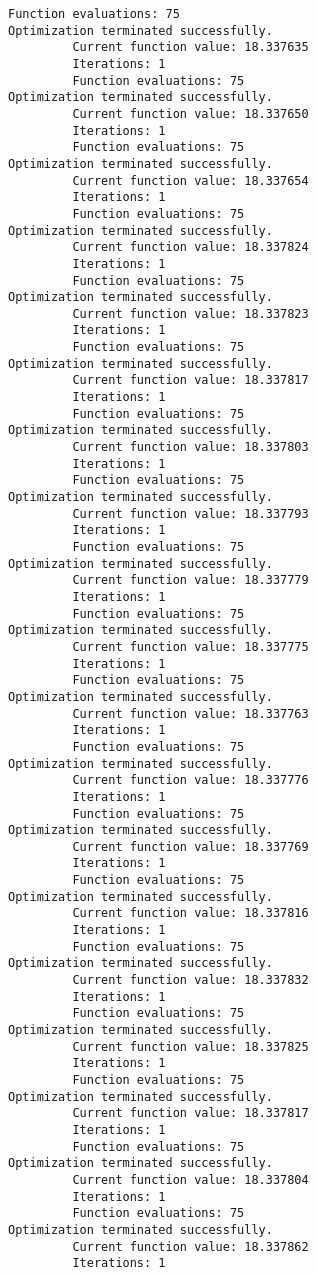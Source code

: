 \documentclass[11pt]{article}
\begin{document}
\begin{Verbatim}[commandchars=\\\{\}]
         Function evaluations: 75
Optimization terminated successfully.
         Current function value: 18.337635
         Iterations: 1
         Function evaluations: 75
Optimization terminated successfully.
         Current function value: 18.337650
         Iterations: 1
         Function evaluations: 75
Optimization terminated successfully.
         Current function value: 18.337654
         Iterations: 1
         Function evaluations: 75
Optimization terminated successfully.
         Current function value: 18.337824
         Iterations: 1
         Function evaluations: 75
Optimization terminated successfully.
         Current function value: 18.337823
         Iterations: 1
         Function evaluations: 75
Optimization terminated successfully.
         Current function value: 18.337817
         Iterations: 1
         Function evaluations: 75
Optimization terminated successfully.
         Current function value: 18.337803
         Iterations: 1
         Function evaluations: 75
Optimization terminated successfully.
         Current function value: 18.337793
         Iterations: 1
         Function evaluations: 75
Optimization terminated successfully.
         Current function value: 18.337779
         Iterations: 1
         Function evaluations: 75
Optimization terminated successfully.
         Current function value: 18.337775
         Iterations: 1
         Function evaluations: 75
Optimization terminated successfully.
         Current function value: 18.337763
         Iterations: 1
         Function evaluations: 75
Optimization terminated successfully.
         Current function value: 18.337776
         Iterations: 1
         Function evaluations: 75
Optimization terminated successfully.
         Current function value: 18.337769
         Iterations: 1
         Function evaluations: 75
Optimization terminated successfully.
         Current function value: 18.337816
         Iterations: 1
         Function evaluations: 75
Optimization terminated successfully.
         Current function value: 18.337832
         Iterations: 1
         Function evaluations: 75
Optimization terminated successfully.
         Current function value: 18.337825
         Iterations: 1
         Function evaluations: 75
Optimization terminated successfully.
         Current function value: 18.337817
         Iterations: 1
         Function evaluations: 75
Optimization terminated successfully.
         Current function value: 18.337804
         Iterations: 1
         Function evaluations: 75
Optimization terminated successfully.
         Current function value: 18.337862
         Iterations: 1

\end{Verbatim}
\end{document}
